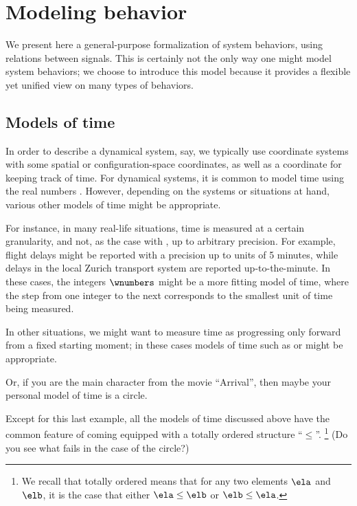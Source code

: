 
\section{Modeling behavior}

We present here a general-purpose formalization of system behaviors, using relations between signals.
This is certainly not the only way one might model system behaviors; we choose to introduce this model because it provides a flexible yet unified view on many types of behaviors.

\subsection{Models of time}

In order to describe a dynamical system, say, we typically use coordinate systems with some spatial or configuration-space coordinates, as well as a coordinate for keeping track of time.
For dynamical systems, it is common to model time using the real numbers \reals.
However, depending on the systems or situations at hand, various other models of time might be appropriate.

For instance, in many real-life situations, time is measured at a certain granularity, and not, as the case with \reals, up to arbitrary precision.
For example, flight delays might be reported with a precision up to units of 5 minutes, while delays in the local Zurich transport system are reported up-to-the-minute.
In these cases, the integers $\wnumbers$ might be a more fitting model of time, where the step from one integer to the next corresponds to the smallest unit of time being measured.

In other situations, we might want to measure time as progressing only forward from a fixed starting moment; in these cases models of time such as \nonNegReals  or \natnumbers  might be appropriate.

Or, if you are the main character from the movie ``Arrival'', then maybe your personal model of time is a circle.


Except for this last example, all the models of time discussed above have the common feature of coming equipped with a totally ordered  structure ``$\leq$''.
\footnote{We recall that totally ordered means that for any two elements $\ela$ and $\elb$, it is the case that either $\ela \leq \elb$ or $\elb \leq \ela$.}  (Do you see what fails in the case of the circle?)

